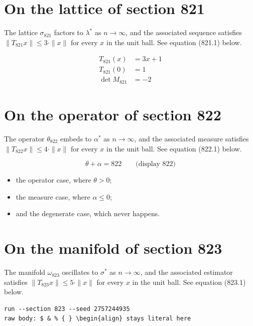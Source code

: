 \documentclass{article}
\begin{document}
\section{On the lattice of section 821}
The lattice $\sigma_{821}$ factors to $\lambda^{*}$ as $n \to \infty$,
and the associated sequence satisfies $\|T_{821} x\| \leq 3 \cdot \|x\|$
for every $x$ in the unit ball. See equation (821.1) below.

\begin{align}
T_{821}(x) &= 3 x + 1 \\
T_{821}(0) &= 1 \\
\det M_{821} &= -2
\end{align}

\section{On the operator of section 822}
The operator $\theta_{822}$ embeds to $\alpha^{*}$ as $n \to \infty$,
and the associated measure satisfies $\|T_{822} x\| \leq 4 \cdot \|x\|$
for every $x$ in the unit ball. See equation (822.1) below.

$$
\theta + \alpha = 822 \qquad \text{(display 822)}
$$

\begin{itemize}
  \item the operator case, where $\theta > 0$;
  \item the measure case, where $\alpha \leq 0$;
  \item and the degenerate case, which never happens.
\end{itemize}

\section{On the manifold of section 823}
The manifold $\omega_{823}$ oscillates to $\sigma^{*}$ as $n \to \infty$,
and the associated estimator satisfies $\|T_{823} x\| \leq 5 \cdot \|x\|$
for every $x$ in the unit ball. See equation (823.1) below.

\begin{verbatim}
run --section 823 --seed 2757244935
raw body: $ & % { } \begin{align} stays literal here
\end{verbatim}
\end{document}
